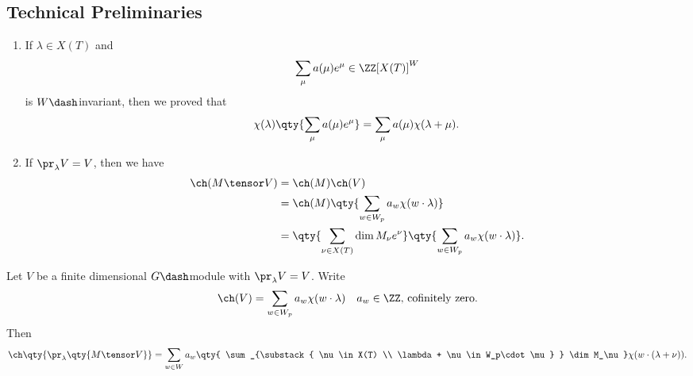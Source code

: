 \hypertarget{technical-preliminaries}{%
\subsection{Technical Preliminaries}\label{technical-preliminaries}}

\begin{enumerate}
\def\labelenumi{\arabic{enumi}.}
\item
  If \(\lambda \in X(T)\) and
  \begin{align*}  
    \sum_\mu a(\mu) e^\mu \in \ZZ[X(T)]^W
    \end{align*} is \(W\dash\)invariant, then we proved that
  \begin{align*}  
    \chi(\lambda)
    \qty{
    \sum_\mu a(\mu) e^{\mu}
    }
    = \sum_\mu a(\mu) \chi(\lambda + \mu)
    .\end{align*}
\item
  If \(\pr_\lambda V = V\), then we have
  \begin{align*}  
  \ch(M\tensor V) 
  &= \ch(M) \ch(V) \\
  &= \ch(M) \qty{\sum_{w\in W_p} a_w \chi(w\cdot\lambda) } \\
  &= \qty{ \sum_{\nu \in X(T)} \dim M_\nu e^\nu } \qty{\sum_{w\in W_p} a_w \chi(w\cdot\lambda) }
  .\end{align*}
\end{enumerate}

\begin{proposition}[?]

Let \(V\) be a finite dimensional \(G\dash\)module with
\(\pr_\lambda V = V\). Write
\begin{align*}  
\ch(V) = \sum_{w\in W_p} a_w \chi(w\cdot \lambda) \quad
a_w\in \ZZ,\, \text{cofinitely zero}
.\end{align*} Then
\begin{align*}  
\ch\qty{\pr_\lambda \qty{ M\tensor V } } = 
\sum_{w\in W} a_w  \qty{ \sum_{\substack{ \nu \in X(T) \\ \lambda + \nu \in W_p\cdot \mu} } \dim M_\nu } \chi(w\cdot (\lambda + \nu) )
.\end{align*}

\end{proposition}

